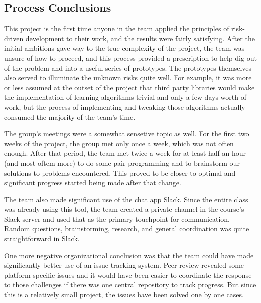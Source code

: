 
\subsection{Process Conclusions}
\label{sec:conc:process-conclusions}
This project is the first time anyone in the team applied the
principles of risk-driven development to their work, and the results
were fairly satisfying.
After the initial ambitions gave way to the true complexity of the
project, the team was unsure of how to proceed, and this process
provided a prescription to help dig out of the problem and into a
useful series of prototypes.
The prototypes themselves also served to illuminate the unknown risks
quite well.
For example, it was more or less assumed at the outset of the project
that third party libraries would make the implementation of learning
algorithms trivial and only a few days worth of work, but the process
of implementing and tweaking those algorithms actually consumed the
majority of the team's time.

The group's meetings were a somewhat sensetive topic as well.
For the first two weeks of the project, the group met only once a
week, which was not often enough.
After that period, the team met twice a week for at least half an hour
(and most oftem more) to do some pair programming and to brainstorm
our solutions to problems encountered.
This proved to be closer to optimal and significant progress started
being made after that change.

The team also made significant use of the chat app Slack.
Since the entire class was already using this tool, the team created a
private channel in the course's Slack server and used that as the
primary touchpoint for communication.
Random questions, brainstorming, research, and general coordination
was quite straightforward in Slack.

One more negative organizational conclusion was that the team could
have made significantly better use of an issue-tracking system.
Peer review revealed some platform specific issues and it would have
been easier to coordinate the response to those challenges if there
was one central repository to track progress. But since this is a 
relatively small project, the issues have been solved one by one cases. 


